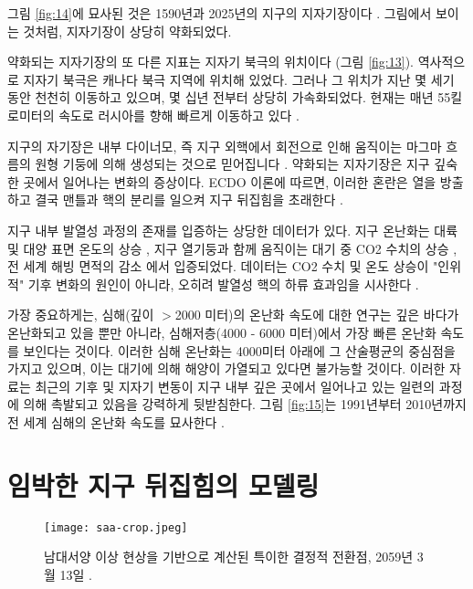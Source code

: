 \documentclass[10pt,twocolumn,letterpaper]{article}
\begin{document}
\begin{개요}
그림 \ref{fig:14}에 묘사된 것은 1590년과 2025년의 지구의 지자기장이다 \cite{125,126}. 그림에서 보이는 것처럼, 지자기장이 상당히 약화되었다.

약화되는 지자기장의 또 다른 지표는 지자기 북극의 위치이다 (그림 \ref{fig:13}). 역사적으로 지자기 북극은 캐나다 북극 지역에 위치해 있었다. 그러나 그 위치가 지난 몇 세기 동안 천천히 이동하고 있으며, 몇 십년 전부터 상당히 가속화되었다. 현재는 매년 55킬로미터의 속도로 러시아를 향해 빠르게 이동하고 있다 \cite{124}.



지구의 자기장은 내부 다이너모, 즉 지구 외핵에서 회전으로 인해 움직이는 마그마 흐름의 원형 기둥에 의해 생성되는 것으로 믿어집니다 \cite{123}. 약화되는 지자기장은 지구 깊숙한 곳에서 일어나는 변화의 증상이다. ECDO 이론에 따르면, 이러한 혼란은 열을 방출하고 결국 맨틀과 핵의 분리를 일으켜 지구 뒤집힘을 초래한다 \cite{1}.

지구 내부 발열성 과정의 존재를 입증하는 상당한 데이터가 있다. 지구 온난화는 대륙 및 대양 표면 온도의 상승 \cite{127,128}, 지구 열기둥과 함께  움직이는 대기 중 CO2 수치의 상승 \cite{129,130}, 전 세계 해빙 면적의 감소 \cite{131}에서 입증되었다. 데이터는 CO2 수치 및 온도 상승이 "인위적" 기후 변화의 원인이 아니라, 오히려 발열성 핵의 하류 효과임을 시사한다 \cite{129}.

가장 중요하게는, 심해(깊이 $>$2000 미터)의 온난화 속도에 대한 연구는 깊은 바다가 온난화되고 있을 뿐만 아니라, 심해저층(4000 - 6000 미터)에서 가장 빠른 온난화 속도를 보인다는 것이다. 이러한 심해 온난화는 4000미터 아래에 그 산술평균의 중심점을 가지고 있으며\cite{132,129}, 이는 대기에 의해  해양이 가열되고 있다면 불가능할 것이다. 이러한 자료는 최근의  기후 및 지자기 변동이 지구 내부 깊은 곳에서 일어나고 있는 일련의 과정에 의해 촉발되고 있음을 강력하게 뒷받침한다. 그림 \ref{fig:15}는 1991년부터 2010년까지 전 세계 심해의 온난화 속도를 묘사한다 \cite{132}.

\section{임박한 지구 뒤집힘의 모델링}

\begin{figure}[b]
\begin{center}
   \texttt{[image: saa-crop.jpeg]}
\end{center}
   \caption{남대서양 이상 현상을 기반으로 계산된 특이한 결정적 전환점, 2059년 3월 13일 \cite{125,126}.}
\label{fig:16}
\label{fig:onecol}
\end{figure}


\end{개요}
\end{document}
